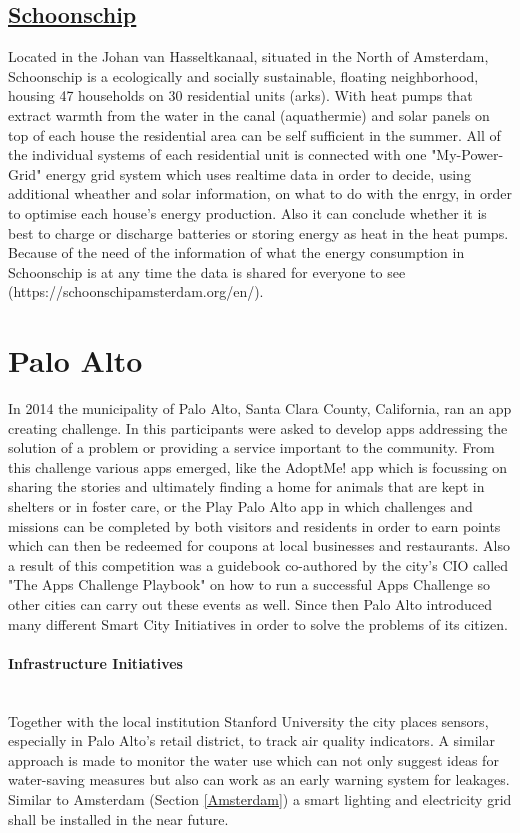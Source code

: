 \documentclass[a4paper,12pt]{report}
\begin{document}
		\subsection[Schoonschip]{\href{https://schoonschipamsterdam.org/en/}{Schoonschip}}
		\startsubsection
			Located in the Johan van Hasseltkanaal, situated in the North of Amsterdam, Schoonschip is a ecologically and socially sustainable, floating neighborhood, housing 47 households on 30 residential units (arks). With heat pumps that extract warmth from the water in the canal (aquathermie) and solar panels on top of each house the residential area can be self sufficient in the summer. All of the individual systems of each residential unit is connected with one "My-Power-Grid" energy grid system which uses realtime data in order to decide, using additional wheather and solar information, on what to do with the enrgy, in order to optimise each house's energy production. Also it can conclude whether it is best to charge or discharge batteries or storing energy as heat in the heat pumps. Because of the need of the information of what the energy consumption in Schoonschip is at any time the data is shared for everyone to see (https://schoonschipamsterdam.org/en/).
		\closesection
	\closesection
	
	\section[Palo Alto]{Palo Alto \cite{SmartCityPaloAlto}}
	\startsection
		In 2014 the municipality of Palo Alto, Santa Clara County, California, ran an app creating challenge. In this participants were asked to develop apps addressing the solution of a problem or providing a service important to the community. From this challenge various apps emerged, like the AdoptMe! app which is focussing on sharing the stories and ultimately finding a home for animals that are kept in shelters or in foster care, or the Play Palo Alto app in which challenges and missions can be completed by both visitors and residents in order to earn points which can then be redeemed for coupons at local businesses and restaurants. Also a result of this competition was a guidebook co-authored by the city's CIO called "The Apps Challenge Playbook" \cite{AppsChallengePlaybook} on how to run a successful Apps Challenge so other cities can carry out these events as well. Since then Palo Alto introduced many different Smart City Initiatives in order to solve the problems of its citizen.
		\paragraph{Infrastructure Initiatives} \hfill \\
		Together with the local institution Stanford University the city places sensors, especially in Palo Alto's retail district, to track air quality indicators. A similar approach is made to monitor the water use which can not only suggest ideas for water-saving measures but also can work as an early warning system for leakages. Similar to Amsterdam (Section \ref{Amsterdam}) a smart lighting and electricity grid shall be installed in the near future.
\end{document}
